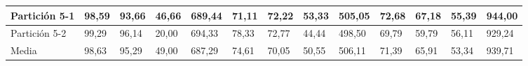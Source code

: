 \documentclass[10pt,a4paper]{article}
\begin{document}
\begin{table}[H]
{\begin{tabular}{|l|l|l|l|l|l|l|l|l|l|l|l|l|}
Partición 5-1                                & 98,59        & 93,66         & 46,66   & 689,44 & 71,11        & 72,22         & 53,33   & 505,05 & 72,68        & 67,18         & 55,39   & 944,00 \\ \hline
Partición 5-2                                & 99,29        & 96,14         & 20,00   & 694,33 & 78,33        & 72,77         & 44,44   & 498,50 & 69,79        & 59,79         & 56,11   & 929,24 \\ \hline
Media                                        & 98,63        & 95,29         & 49,00   & 687,29 & 74,61        & 70,05         & 50,55   & 506,11 & 71,39        & 65,91         & 53,34   & 939,71 \\ \hline
\end{tabular}}
\end{table}
\end{document}
